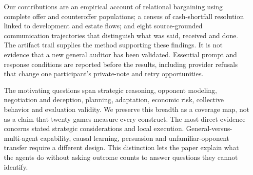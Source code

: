 Our contributions are an empirical account of relational bargaining using complete offer and counteroffer populations; a census of cash-shortfall resolution linked to development and estate flows; and eight source-grounded communication trajectories that distinguish what was said, received and done. The artifact trail supplies the method supporting these findings. It is not evidence that a new general auditor has been validated. Essential prompt and response conditions are reported before the results, including provider refusals that change one participant's private-note and retry opportunities.

The motivating questions span strategic reasoning, opponent modeling, negotiation and deception, planning, adaptation, economic risk, collective behavior and evaluation validity. We preserve this breadth as a coverage map, not as a claim that twenty games measure every construct. The most direct evidence concerns stated strategic considerations and local execution. General-versus-multi-agent capability, causal learning, persuasion and unfamiliar-opponent transfer require a different design. This distinction lets the paper explain what the agents do without asking outcome counts to answer questions they cannot identify.
